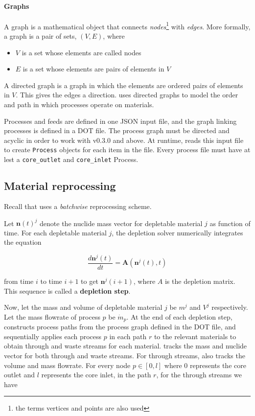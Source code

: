 \paragraph{Graphs}
    A graph is a mathematical object that connects {\it nodes}\footnote{the
    terms vertices and points are also used} with {\it edges}. More formally,
    a graph is a pair of sets, $(V, E)$, where
    \begin{itemize}
        \item $V$ is a set whose elements are called nodes
        \item $E$ is a set whose elements are pairs of elements in $V$
    \end{itemize}
    A directed graph is a graph in which the elements are ordered pairs of elements
    in $V$. This gives the edges a direction. \SaltProc uses directed graphs to
    model the order and path in which processes operate on materials.
        
Processes and feeds are defined in one JSON input file, and the graph linking
processes is defined in a DOT file. The process graph must be directed and
acyclic in order to work with \SaltProc v0.3.0 and above. At runtime,
\SaltProc reads this input file to create \verb.Process. objects for each item
in the file. Every process file must have at lest a \verb.core_outlet. and
\verb.core_inlet. Process.

\subsection{Material reprocessing}
Recall that \SaltProc uses a {\it batchwise} reprocessing scheme.

Let $\mathbf{n}(t)^{j}$ denote the nuclide mass vector for depletable material
$j$ as function of time. For each depletable material $j$, the depletion
solver numerically integrates the equation

\begin{equation}
    \frac{d\mathbf{n}^{j}(t)}{dt} = \mathbf{A}(\mathbf{n}^{j}(t), t)
\end{equation}

from time $i$ to time $i+1$ to get $\mathbf{n}^{j}(i+1)$, where $A$ is the
depletion matrix. This sequence is called a {\bf depletion step}.

Now, let the mass and volume of depletable material $j$ be
$m^{j}$ and $V^{j}$ respectively. Let the mass flowrate of process $p$ be
$\dot{m}_{p}$. At the end of each depletion step, \SaltProc constructs process
paths from the process graph defined in the DOT file, and sequentially applies
each process $p$ in each path $r$ to the relevant materials to obtain through
and waste streams for each material. \SaltProc tracks the mass and nuclide vector for both through and waste streams. For through
streams, \SaltProc also tracks the volume and mass flowrate. For every node
$p\in[0,l]$ where $0$ represents the core outlet and $l$ represents the core
inlet, in the path $r$, for the through streams we have

